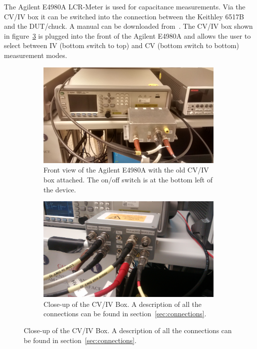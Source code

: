\documentclass[a4paper]{article}
\begin{document}
The Agilent E4980A LCR-Meter is used for capacitance measurements.
Via the CV/IV box it can be switched into the connection between the Keithley 6517B and the DUT/chuck.
A manual can be downloaded from~\cite{ref:agilentref}.
The CV/IV box shown in figure~\ref{fig:cvivbox} is plugged into the front of the Agilent E4980A and allows the user to select between IV (bottom switch to top) and CV (bottom switch to bottom) measurement modes.\\

\begin{figure}[hbtp]
\centering
\begin{subfigure}[t]{0.475\textwidth}
\centering\captionsetup{width=.8\linewidth}%
\includegraphics[width=\linewidth]{pictures/front_agilent.jpg}
\caption[Front View of the Agilent E4980A]{Front view of the Agilent E4980A with the old CV/IV box attached. The on/off switch is at the bottom left of the device.}
\label{fig:agilent}
\end{subfigure}
\begin{subfigure}[t]{0.475\textwidth}
\centering\captionsetup{width=.8\linewidth}%
\includegraphics[width=\linewidth]{pictures/cvivswitch2.jpg}
\caption[The CV/IV Box]{Close-up of the CV/IV Box. A description of all the connections can be found in section~\ref{sec:connections}.}
\label{fig:cvivbox}
\end{subfigure}
\end{figure}
\end{document}

